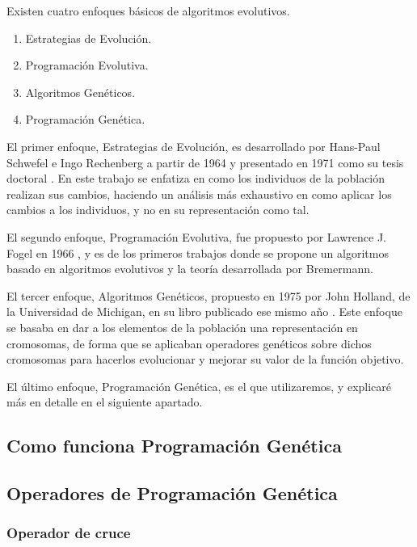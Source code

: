 Existen cuatro enfoques básicos de algoritmos evolutivos.

\begin{enumerate}
	\item Estrategias de Evolución.
	\item Programación Evolutiva.
	\item Algoritmos Genéticos.
	\item Programación Genética.
\end{enumerate}

El primer enfoque, Estrategias de Evolución, es desarrollado por Hans-Paul Schwefel e Ingo Rechenberg a partir de 1964 y presentado en 1971 como su tesis doctoral \cite{estrategiasEvolucion}. En este trabajo se enfatiza en como los individuos de la población realizan sus cambios, haciendo un análisis más exhaustivo en como aplicar los cambios a los individuos, y no en su representación como tal.

El segundo enfoque, Programación Evolutiva, fue propuesto por Lawrence J. Fogel en 1966 \cite{programacionEvolutiva}, y es de los primeros trabajos donde se propone un algoritmos basado en algoritmos evolutivos y la teoría desarrollada por Bremermann.

El tercer enfoque, Algoritmos Genéticos, propuesto en 1975 por John Holland, de la Universidad de Michigan, en su libro publicado ese mismo año \cite{libroAlgoritmosGeneticos}. Este enfoque se basaba en dar a los elementos de la población una representación en cromosomas, de forma que se aplicaban operadores genéticos sobre dichos cromosomas para hacerlos evolucionar y mejorar su valor de la función objetivo.

El último enfoque, Programación Genética, es el que utilizaremos, y explicaré más en detalle en el siguiente apartado.


\subsection{Como funciona Programación Genética}


\subsection{Operadores de Programación Genética}

\subsubsection{Operador de cruce}

